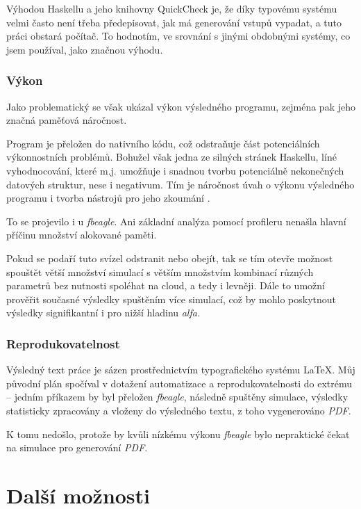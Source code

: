 Výhodou Haskellu a jeho knihovny QuickCheck \citep{Claessen:2000:QLT:351240.351266} je, že díky typovému systému velmi
často není třeba předepisovat, jak má generování vstupů vypadat, a tuto práci obstará počítač.
To hodnotím, ve srovnání s jinými obdobnými systémy, co jsem používal, jako značnou výhodu.

\subsubsection{Výkon}

Jako problematický se však ukázal výkon výsledného programu, zejména pak jeho značná paměťová náročnost.

Program je přeložen do nativního kódu, což odstraňuje část potenciálních výkonnostních problémů. Bohužel však jedna ze silných stránek
Haskellu, líné vyhodnocování, které m.j. umožňuje i snadnou tvorbu potenciálně nekonečných datových struktur, nese i negativum.
Tím je náročnost úvah o výkonu výsledného programu i tvorba nástrojů pro jeho zkoumání \citep{wadler1998no}.

To se projevilo i u \textit{fbeagle}. Ani základní analýza pomocí profileru nenašla hlavní příčinu množství alokované paměti.

Pokud se podaří tuto svízel odstranit nebo obejít, tak se tím otevře možnost spouštět větší množství simulací s větším množstvím kombinací
různých parametrů bez nutnosti spoléhat na cloud, a tedy i levněji. Dále to umožní prověřit současné výsledky spuštěním více simulací, což by
mohlo poskytnout výsledky signifikantní i pro nižší hladinu \textit{alfa.}

\subsubsection{Reprodukovatelnost}

Výsledný text práce je sázen prostřednictvím typografického systému \LaTeX. Můj původní plán spočíval v dotažení
automatizace a reprodukovatelnosti do extrému -- jedním příkazem by byl přeložen \textit{fbeagle}, následně
spuštěny simulace, výsledky statisticky zpracovány a vloženy do výsledného textu, z toho vygenerováno \textit{PDF}.

K tomu nedošlo, protože by kvůli nízkému výkonu \textit{fbeagle} bylo nepraktické čekat na simulace pro generování
\textit{PDF}.


\section{Další možnosti}

